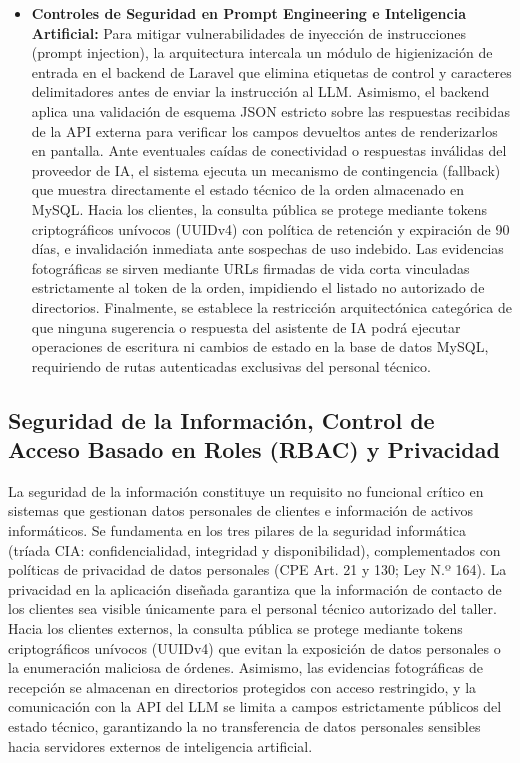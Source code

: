 \begin{itemize}
    \item \textbf{Controles de Seguridad en Prompt Engineering e Inteligencia Artificial:} Para mitigar vulnerabilidades de inyección de instrucciones (prompt injection), la arquitectura intercala un módulo de higienización de entrada en el backend de Laravel que elimina etiquetas de control y caracteres delimitadores antes de enviar la instrucción al LLM. Asimismo, el backend aplica una validación de esquema JSON estricto sobre las respuestas recibidas de la API externa para verificar los campos devueltos antes de renderizarlos en pantalla. Ante eventuales caídas de conectividad o respuestas inválidas del proveedor de IA, el sistema ejecuta un mecanismo de contingencia (fallback) que muestra directamente el estado técnico de la orden almacenado en MySQL. Hacia los clientes, la consulta pública se protege mediante tokens criptográficos unívocos (UUIDv4) con política de retención y expiración de 90 días, e invalidación inmediata ante sospechas de uso indebido. Las evidencias fotográficas se sirven mediante URLs firmadas de vida corta vinculadas estrictamente al token de la orden, impidiendo el listado no autorizado de directorios. Finalmente, se establece la restricción arquitectónica categórica de que ninguna sugerencia o respuesta del asistente de IA podrá ejecutar operaciones de escritura ni cambios de estado en la base de datos MySQL, requiriendo de rutas autenticadas exclusivas del personal técnico.
\end{itemize}

\subsection{Seguridad de la Información, Control de Acceso Basado en Roles (RBAC) y Privacidad}

La seguridad de la información constituye un requisito no funcional crítico en sistemas que gestionan datos personales de clientes e información de activos informáticos. Se fundamenta en los tres pilares de la seguridad informática (tríada CIA: confidencialidad, integridad y disponibilidad), complementados con políticas de privacidad de datos personales (CPE Art. 21 y 130; Ley N.º 164). La privacidad en la aplicación diseñada garantiza que la información de contacto de los clientes sea visible únicamente para el personal técnico autorizado del taller. Hacia los clientes externos, la consulta pública se protege mediante tokens criptográficos unívocos (UUIDv4) que evitan la exposición de datos personales o la enumeración maliciosa de órdenes. Asimismo, las evidencias fotográficas de recepción se almacenan en directorios protegidos con acceso restringido, y la comunicación con la API del LLM se limita a campos estrictamente públicos del estado técnico, garantizando la no transferencia de datos personales sensibles hacia servidores externos de inteligencia artificial.

